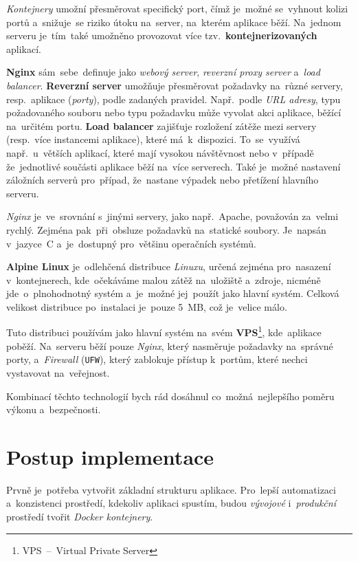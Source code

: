 \documentclass[11pt,a4paper]{report}
\begin{document}
            \emph{Kontejnery} umožní přesměrovat specifický port, čímž je~možné se~vyhnout kolizi portů a~snižuje~se riziko útoku na~server, na~kterém aplikace běží. Na~jednom serveru je~tím~také umožněno provozovat více tzv.~\textbf{kontejnerizovaných} aplikací. \cite{docker, dockernginxperformance}

            \textbf{Nginx} sám~sebe~definuje jako \emph{webový server}, \emph{reverzní proxy server} a~\emph{load balancer}. \textbf{Reverzní server} umožňuje přesměrovat požadavky na~různé servery, resp.~aplikace (\emph{porty}), podle zadaných pravidel. Např.~podle \emph{URL adresy}, typu požadovaného souboru nebo typu požadavku může vyvolat akci aplikace, běžící na~určitém portu. \textbf{Load balancer} zajišťuje rozložení zátěže mezi servery (resp.~více instancemi aplikace), které má~k~dispozici. To~se~využívá např.~u~větších aplikací, které mají vysokou návštěvnost nebo v~případě že~jednotlivé součásti aplikace běží na~více serverech. Také je~možné nastavení záložních serverů pro~případ, že~nastane výpadek nebo přetížení hlavního serveru.
            
            \emph{Nginx} je~ve~srovnání s~jinými servery, jako např.~Apache, považován za~velmi rychlý. Zejména pak~při~obsluze požadavků na~statické soubory. Je~napsán v~jazyce~C a~je~dostupný pro~většinu operačních systémů. \cite{WhatNGINX}

            \textbf{Alpine Linux} je~odlehčená distribuce \emph{Linuxu}, určená zejména pro~nasazení v~kontejnerech, kde~očekáváme malou zátěž na~uložiště a~zdroje, nicméně jde~o~plnohodnotný systém a~je~možné jej~použít jako hlavní systém. Celková velikost distribuce po~instalaci je~pouze 5~MB, což je~velice málo.

            Tuto distribuci používám jako hlavní systém na~svém \textbf{VPS}\footnote{VPS~--~Virtual Private Server}, kde~aplikace poběží. Na~serveru běží pouze \emph{Nginx}, který nasměruje požadavky na~správné porty, a~\emph{Firewall} (\texttt{UFW}), který zablokuje přístup k~portům, které nechci vystavovat na~veřejnost.

            Kombinací těchto technologií bych rád dosáhnul co~možná~nejlepšího poměru výkonu a~bezpečnosti.
	
	\chapter{Postup implementace}
        Prvně je~potřeba vytvořit základní strukturu aplikace. Pro~lepší automatizaci a~konzistenci prostředí, kdekoliv aplikaci spustím, budou \emph{vývojové} i~\emph{produkční} prostředí tvořit \emph{Docker kontejnery}.
\end{document}
